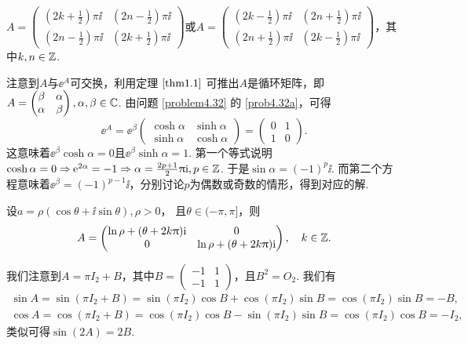 \begin{solution}
  $A=\begin{pmatrix}
    \left(2k+\frac12\right)\pi\ii & \left(2n-\frac12\right)\pi\ii \\
    \left(2n-\frac12\right)\pi\ii &
    \left(2k+\frac12\right)\pi\ii
  \end{pmatrix}$或$A=\begin{pmatrix}
    \left(2k-\frac12\right)\pi\ii & \left(2n+\frac12\right)\pi\ii \\
    \left(2n+\frac12\right)\pi\ii &
    \left(2k-\frac12\right)\pi\ii
  \end{pmatrix}$，其中$k,n\in\mathbb Z$.

  注意到$A$与$\ee^A$可交换，利用定理 $\ref{thm1.1}$ 可推出$A$是循环矩阵，即$A=\begin{pmatrix}
    \beta & \alpha \\
    \alpha & \beta
  \end{pmatrix},\alpha,\beta\in\mathbb C$. 由问题 \ref{problem4.32} 的 \ref{prob4.32a}，可得
  \[
    \ee^A = \ee^\beta \begin{pmatrix}
      \cosh \alpha & \sinh \alpha \\
      \sinh \alpha & \cosh \alpha
    \end{pmatrix} =
    \begin{pmatrix}
      0 & 1 \\
      1 & 0
    \end{pmatrix}.
  \]
  这意味着$\ee^\beta\cosh\alpha=0$且$\ee^\beta\sinh\alpha=1$. 第一个等式说明$\cosh\alpha=0\Rightarrow\operatorname{\!\!\;\mathrm e}^{2\alpha}=-1\Rightarrow\alpha=\frac{2p+1}2\uppi\mathrm i,p\in\mathbb Z$. 于是$\sin\alpha=(-1)^p\ii$. 而第二个方程意味着$\ee^\beta=(-1)^{p-1}\ii$，分别讨论$p$为偶数或奇数的情形，得到对应的解.
\end{solution}

\begin{solution}
  设$a=\rho(\cos\theta+\ii\sin\theta),\rho>0$，
  且$\theta\in(-\pi,\pi]$，则
  \[
    A = \begin{pmatrix}
      \ln\rho + (\theta+2k\uppi)\mathrm i & 0 \\
      0 & \ln\rho + (\theta+2k\uppi)\mathrm i
    \end{pmatrix},\quad k\in\mathbb Z.
  \]
\end{solution}

\begin{solution}
  我们注意到$A=\pi I_2+B$，其中$B=\begin{pmatrix}
    -1 & 1 \\
    -1 & 1
  \end{pmatrix}$，且$B^2=O_2$. 我们有
  \begin{gather*}
    \sin A = \sin(\pi I_2 +B) = \sin(\pi I_2)\cos B + \cos(\pi I_2)\sin B = \cos(\pi I_2)\sin B = - B, \\
    \cos A = \cos(\pi I_2 + B) = \cos(\pi I_2)\cos B - \sin(\pi I_2)\sin B = \cos(\pi I_2)\cos B = -I_2,
  \end{gather*}
  类似可得$\sin(2A)=2B$.
\end{solution}

